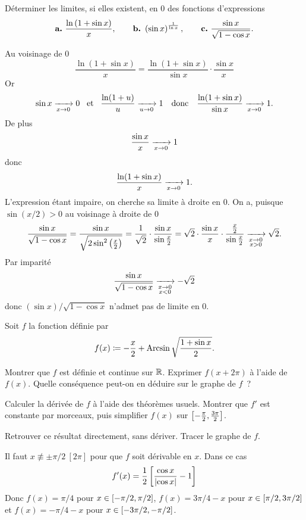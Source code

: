\documentclass{magnolia}
\begin{document}
Déterminer les limites, si elles existent, en $0$ des fonctions
d'expressions
\[\textbf{a.}\ \frac{\ln\p{1+\sin x}}{x}, \qquad \textbf{b.}\ \p{\sin x}^{\frac{1}{\ln x}},
  \qquad \textbf{c.}\ \frac{\sin x}{\sqrt{1-\cos x}}.\]
\begin{sol}
\begin{questions}
\question Au voisinage de 0
  \[\frac{\ln(1+\sin x)}{x}=\frac{\ln(1+\sin x)}{\sin x}\cdot\frac{\sin x}{x}\]
  Or
  \[\sin x\xrightarrow[x\rightarrow 0]{}0 \quad\!\text{et}\quad\! \frac{\ln(1+u)}{u}\xrightarrow[u\rightarrow 0]{}1 \quad\text{donc}\quad
    \frac{\ln(1+\sin x)}{\sin x}\xrightarrow[x\rightarrow 0]{}1.\]
  De plus
  \[\frac{\sin x}{x}\xrightarrow[x\rightarrow 0]{}1\]
  donc
  \[\frac{\ln(1+\sin x)}{x}\xrightarrow[x\rightarrow 0]{}1.\]
\question L'expression étant impaire, on cherche sa limite à droite en 0. On a, puisque $\sin(x/2)>0$ au voisinage à droite de 0
  \[\frac{\sin x}{\sqrt{1-\cos x}}=\frac{\sin x}{\sqrt{2\sin^2\left(\frac{x}{2}\right)}}=\frac{1}{\sqrt{2}}\cdot\frac{\sin x}{\sin \frac{x}{2}}=\sqrt{2}\cdot\frac{\sin x}{x}\cdot\frac{\frac{x}{2}}{\sin\frac{x}{2}}\xrightarrow[ \substack{x\rightarrow 0 \\ x>0}]{}\sqrt{2}.\]
  Par imparité
  \[\frac{\sin x}{\sqrt{1-\cos x}}\xrightarrow[ \substack{x\rightarrow 0 \\ x<0}]{}-\sqrt{2}\]
  donc $(\sin x)/\sqrt{1-\cos x}$ n'admet pas de limite en 0.
\end{questions}
\end{sol}




Soit $f$ la fonction définie par 
  \[f(x)\coloneqq -\frac{x}{2}+\operatorname{Arcsin}\sqrt{\frac{1+\sin x}{2}}.\]
\begin{questions}
\question Montrer que $f$ est définie et continue sur $\mathbb{R}$.
\question Exprimer $f(x+2\pi)$ à l'aide de $f(x)$. Quelle conséquence peut-on en déduire
  sur le graphe de $f$~?
\question
  \begin{questions}
  \question Calculer la dérivée de $f$ à l'aide des théorèmes usuels.
  \question Montrer que $f'$ est constante par morceaux, puis simplifier $f(x)$
  sur $\left[-\frac{\pi}{2},\frac{3\pi}{2}\right]$.
  \end{questions}
\question Retrouver ce résultat directement, sans dériver.
\question Tracer le graphe de $f$.
\end{questions}
  \begin{sol}
  Il faut $x\not\equiv\pm\pi/2\ [2\pi]$ pour que $f$ soit dérivable en $x$. Dans
  ce cas
  \[f'(x)=\frac{1}{2}\left[\frac{\cos x}{\left|\cos x\right|}-1\right]\]
  Donc $f(x)=\pi/4$ pour $x\in\left[-\pi/2,\pi/2\right]$, $f(x)=3\pi/4-x$
  pour $x\in\left[\pi/2,3\pi/2\right]$ et $f(x)=-\pi/4-x$ pour
  $x\in\left[-3\pi/2,-\pi/2\right]$.
  \end{sol}
\end{document}
